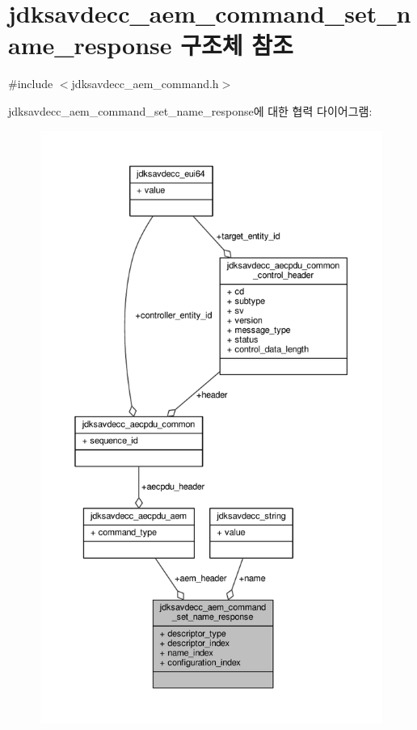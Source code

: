 \hypertarget{structjdksavdecc__aem__command__set__name__response}{}\section{jdksavdecc\+\_\+aem\+\_\+command\+\_\+set\+\_\+name\+\_\+response 구조체 참조}
\label{structjdksavdecc__aem__command__set__name__response}


{\ttfamily \#include $<$jdksavdecc\+\_\+aem\+\_\+command.\+h$>$}



jdksavdecc\+\_\+aem\+\_\+command\+\_\+set\+\_\+name\+\_\+response에 대한 협력 다이어그램\+:
\nopagebreak
\begin{figure}[H]
\begin{center}
\leavevmode
\includegraphics[height=550pt]{structjdksavdecc__aem__command__set__name__response__coll__graph}
\end{center}
\end{figure}
